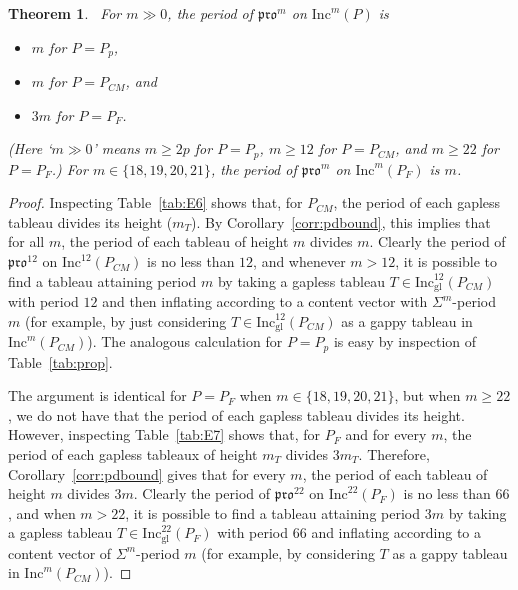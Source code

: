 \documentclass[12pt]{amsart}
\newtheorem{theorem}{Theorem}[section]
\theoremstyle{definition}
\theoremstyle{remark}
\numberwithin{equation}{section}
\newcommand{\inc}{\ensuremath{\mathrm{Inc}}}
\newcommand{\incgl}{\inc_{\mathrm{gl}}}
\newcommand{\pro}{\mathfrak{pro}}
\begin{document}
\begin{theorem}~\label{thm:actualpdbound}
For $m \gg 0$, the period of $\pro^m$ on $\inc^m(P)$ is 
\begin{itemize}
\item $m$ for $P = P_p$, 
\item $m$ for $P = P_{CM}$, and 
\item $3m$ for $P = P_F$. 
\end{itemize}
(Here `$m \gg 0$' means $m \geq 2p$ for $P = P_p$, $m \geq 12$ for $P = P_{CM}$, and $m \geq 22$ for $P = P_F$.) For $m \in \lbrace 18,19,20, 21 \rbrace$, the period of $\pro^m$ on $\inc^m(P_F)$ is $m$.
\end{theorem}
\begin{proof}
Inspecting Table~\ref{tab:E6} shows that, for $P_{CM}$, the period of each gapless tableau  divides its height ($m_T$). By Corollary~\ref{corr:pdbound}, this implies that for all $m$, the period of each tableau of height $m$ divides $m$. Clearly the period of $\pro^{12}$ on $\inc^{12}(P_{CM})$ is no less than $12$, and whenever $m> 12$, it is possible to find a tableau attaining period $m$ by taking a gapless tableau $T \in \incgl^{12}(P_{CM})$ with period $12$ and then inflating according to a content vector with $\Sigma^m$-period $m$ (for example, by just considering $T \in \incgl^{12}(P_{CM})$ as a gappy tableau in $\inc^m(P_{CM})$). The analogous calculation for $P = P_p$ is easy by inspection of Table~\ref{tab:prop}.

The argument is identical for $P = P_F$ when $m \in \lbrace 18,19,20, 21 \rbrace$, but when $m \geq 22$, we do not have that the period of each gapless tableau divides its height. However, inspecting Table~\ref{tab:E7} shows that, for $P_F$ and for every $m$, the period of each gapless tableaux of height $m_T$ divides $3m_T$. Therefore, Corollary~\ref{corr:pdbound} gives that for every $m$, the period of each tableau of height $m$ divides $3m$. Clearly the period of $\pro^{22}$ on $\inc^{22}(P_{F})$ is no less than $66$, and when $m > 22$, it is possible to find a tableau attaining period $3m$ by taking a gapless tableau  $T \in \incgl^{22}(P_F)$ with period $66$ and inflating according to a content vector of $\Sigma^m$-period $m$ (for example, by considering $T$ as a gappy tableau in $\inc^m(P_{CM})$).
\end{proof}
\end{document}
